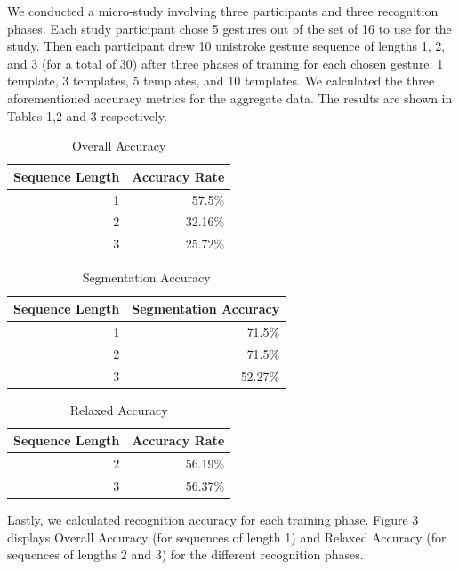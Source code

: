 \documentclass[twoside]{article}
\begin{document}
\begin{multicols}{2}
We conducted a micro-study involving three participants and three recognition
phases. Each study participant chose 5 gestures out of the set of 16 to use for
the study. Then each participant drew 10 unistroke gesture sequence of lengths
1, 2, and 3 (for a total of 30) after three phases of training for each chosen gesture: 1 template, 3
templates, 5 templates, and 10 templates. We calculated the three aforementioned accuracy metrics for
the aggregate data. The results are shown in Tables 1,2 and 3 respectively.

\begin{table}[H]
  \centering
  \caption{Overall Accuracy}
    \begin{tabular}{rr}
    \toprule
    Sequence Length & Accuracy Rate \\
    \midrule
    1     & 57.5\% \\
    2     & 32.16\% \\
    3     & 25.72\% \\
    \bottomrule
    \end{tabular}%
  \label{tab:addlabel}%
\end{table}%

\begin{table}[H]
  \centering
  \caption{Segmentation Accuracy}
    \begin{tabular}{rr}
    \toprule
	Sequence Length & Segmentation Accuracy \\
    \midrule
    1     & 71.5\% \\
    2     & 71.5\% \\
    3     & 52.27\% \\
    \bottomrule
    \end{tabular}%
  \label{tab:addlabel}%
\end{table}%

\begin{table}[H]
  \centering
  \caption{Relaxed Accuracy}
    \begin{tabular}{rr}
    \toprule
    Sequence Length & Accuracy Rate \\
    \midrule
    2     & 56.19\% \\
    3     & 56.37\% \\
    \bottomrule
    \end{tabular}%
  \label{tab:addlabel}%
\end{table}%

Lastly, we calculated recognition accuracy for each training phase. Figure 3
displays Overall Accuracy (for sequences of length 1) and Relaxed Accuracy (for
sequences of lengths 2 and 3) for the different recognition phases.


\end{multicols}
\end{document}
